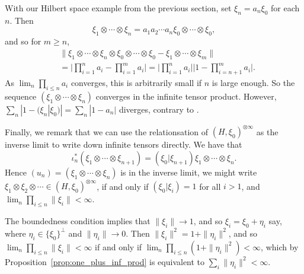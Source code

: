 \documentclass[twoside,a4paper,12pt]{article}
\theoremstyle{plain}
\theoremstyle{definition}
\begin{document}
With our Hilbert space example from the previous section, set $\xi_n = a_n \xi_0$ for each $n$.  Then 
\[ \xi_1 \otimes\cdots \otimes \xi_n = a_1a_2\cdots a_n \xi_0\otimes\cdots\otimes\xi_0, \]
and so for $m \geq n$,
\begin{align*}
& \| \xi_1\otimes\cdots\otimes\xi_n\otimes\xi_0\otimes\cdots\otimes\xi_0 - \xi_1\otimes\cdots\otimes\xi_m \| \\
&= \Big| \prod_{i=1}^n a_i - \prod_{i=1}^m a_i \Big|
= \Big| \prod_{i=1}^n a_i \Big| \Big| 1 - \prod_{i=n+1}^m a_i \Big|.
\end{align*}
As $\lim_n \prod_{i\leq n} a_i$ converges, this is arbitrarily small if $n$ is large enough.  So the sequence $(\xi_1\otimes\cdots\otimes\xi_n)$ converges in the infinite tensor product.  However, $\sum_n |1-(\xi_n|\xi_0)| = \sum_n |1-a_n|$ diverges, contrary to \cite[Lemma~XIV.1.7]{tak3}.

\medskip

Finally, we remark that we can use the relationsation of $(H,\xi_0)^{\otimes\infty}$ as the inverse limit to write down infinite tensors directly.  We have that
\[ \iota_n^*(\xi_1\otimes\cdots\otimes\xi_{n+1}) = (\xi_0|\xi_{n+1}) \xi_1\otimes\cdots\otimes\xi_{n}. \]
Hence $(u_n) = (\xi_1\otimes\cdots\otimes\xi_{n})$ is in the inverse limit, we might write $\xi_1\otimes\xi_2\otimes\cdots \in (H,\xi_0)^{\otimes\infty}$, if and only if $(\xi_0|\xi_i)=1$ for all $i > 1$, and $\lim_n \prod_{i\leq n} \|\xi_i\| < \infty$.

The boundedness condition implies that $\|\xi_i\| \to 1$, and so $\xi_i = \xi_0 + \eta_i$ say, where $\eta_i \in \{ \xi_0 \}^\perp$ and $\|\eta_i\|\to 0$.  Then $\|\xi_i\|^2 = 1 + \|\eta_i\|^2$, and so $\lim_n \prod_{i\leq n} \|\xi_i\| < \infty$ if and only if $\lim_n \prod_{i\leq n} (1+\|\eta_i\|^2) < \infty$, which by Proposition~\ref{prop:one_plus_inf_prod} is equivalent to $\sum_i \|\eta_i\|^2 < \infty$.
\end{document}

